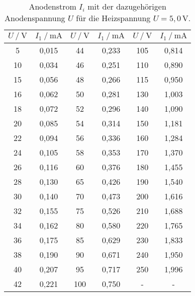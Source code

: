 \begin{table}[H]
    \centering
    \caption{Anodenstrom $I_i$ mit der dazugehörigen Anodenspannung $U$ für die Heizspannung $U = 5,0 \, \unit{\volt} $.}
    \label{tab:kennlini1_5}
    \begin{tabular}{S S S S S[table-format=3.1] S}
      \toprule
      {$U \mathbin{/} \unit{\volt}$} & {$I_1 \mathbin{/} \unit{\milli\ampere}$} & {$U \mathbin{/} \unit{\volt}$} & {$I_1 \mathbin{/} \unit{\milli\ampere}$} & {$U \mathbin{/} \unit{\volt}$} & {$I_1 \mathbin{/} \unit{\milli\ampere}$}  \\
      \midrule
            {5}&       {0,015}&   {44}&      {0,233}& {105}&     {0,814}\\
            {10}&      {0,034}&   {46}&      {0,251}& {110}&     {0,890}\\
            {15}&      {0,056}&   {48}&      {0,266}& {115}&     {0,950}\\
            {16}&      {0,062}&   {50}&      {0,281}& {130}&     {1,003}\\
            {18}&      {0,072}&   {52}&      {0,296}& {140}&     {1,090}\\
            {20}&      {0,085}&   {54}&      {0,314}& {150}&     {1,181}\\
            {22}&      {0,094}&   {56}&      {0,336}& {160}&     {1,284}\\
            {24}&      {0,105}&   {58}&      {0,353}& {170}&     {1,370}\\
            {26}&      {0,116}&   {60}&      {0,376}& {180}&     {1,455}\\
            {28}&      {0,130}&   {65}&      {0,426}& {190}&     {1,540}\\
            {30}&      {0,140}&   {70}&      {0,473}& {200}&     {1,616}\\
            {32}&      {0,155}&   {75}&      {0,526}& {210}&     {1,688}\\
            {34}&      {0,162}&   {80}&      {0,580}& {220}&     {1,765}\\
            {36}&      {0,175}&   {85}&      {0,629}& {230}&     {1,833}\\
            {38}&      {0,190}&   {90}&      {0,671}& {240}&     {1,950}\\
            {40}&      {0,207}&   {95}&      {0,717}& {250}&     {1,996}\\
            {42}&      {0,221}&   {100}&     {0,750}&  {-} & {-}\\
      \bottomrule
    \end{tabular}
\end{table}


